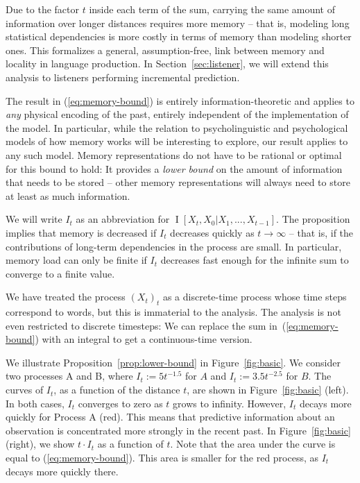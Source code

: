 \documentclass[11pt,letterpaper]{article}
\begin{document}
Due to the factor $t$ inside each term of the sum, carrying the same amount of information over longer distances requires more memory -- that is, modeling long statistical dependencies is more costly in terms of memory than modeling shorter ones.
This formalizes a general, assumption-free, link between memory and locality in language production.
In Section~\ref{sec:listener}, we will extend this analysis to listeners performing incremental prediction.


The result in (\ref{eq:memory-bound}) is entirely information-theoretic and applies to \emph{any} physical encoding of the past, entirely independent of the implementation of the model. %
In particular, while the relation to psycholinguistic and psychological models of how memory works will be interesting to explore, our result applies to any such model.
Memory representations do not have to be rational or optimal for this bound to hold:
It provides a \emph{lower bound} on the amount of information that needs to be stored -- other memory representations will always need to store at least as much information.

We will write $I_t$ as an abbreviation for $\operatorname{I}[X_t, X_0 | X_1, ..., X_{t-1}]$.
The proposition implies that memory is decreased if $I_t$ decreases quickly as $t \rightarrow \infty$ -- that is, if the contributions of long-term dependencies in the process are small.
In particular, memory load can only be finite if $I_t$ decreases fast enough for the infinite sum to converge to a finite value.

We have treated the process $(X_t)_t$ as a discrete-time process whose time steps correspond to words, but this is immaterial to the analysis.
The analysis is not even restricted to discrete timesteps: We can replace the sum in~(\ref{eq:memory-bound}) with an integral to get a continuous-time version.



We illustrate Proposition~\ref{prop:lower-bound} in Figure~\ref{fig:basic}.
We consider two processes A and B, where $I_t := 5t^{-1.5}$ for $A$ and $I_t := 3.5 t^{-2.5}$ for $B$.
The curves of $I_t$, as a function of the distance $t$, are shown in Figure~\ref{fig:basic} (left).
In both cases, $I_t$ converges to zero as $t$ grows to infinity. 
However, $I_t$ decays more quickly for Process A (red).
This means that predictive information about an observation is concentrated more strongly in the recent past.
In Figure~\ref{fig:basic} (right), we show $t\cdot I_t$ as a function of $t$.
Note that the area under the curve is equal to (\ref{eq:memory-bound}).
This area is smaller for the red process, as $I_t$ decays more quickly there.  
\end{document}
